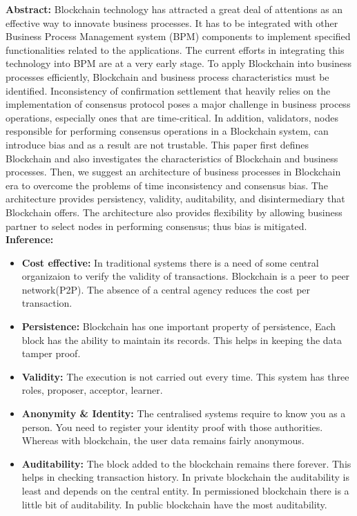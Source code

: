 \documentclass[oneside, 12pt]{book}
\begin{document}
\begin{enumerate}
	      \textbf{Abstract:} Blockchain technology has attracted a great deal of attentions as an effective way to innovate business processes. It has to be integrated with other Business Process Management system (BPM) components to implement specified functionalities related to the applications. The current efforts in integrating this technology into BPM are at a very early stage. To apply Blockchain into business processes efficiently, Blockchain and business process characteristics must be identified. Inconsistency of confirmation settlement that heavily relies on the implementation of consensus protocol poses a major challenge in business process operations, especially ones that are time-critical. In addition, validators, nodes responsible for performing consensus operations in a Blockchain system, can introduce bias and as a result are not trustable. This paper first defines Blockchain and also investigates the characteristics of Blockchain and business processes. Then, we suggest an architecture of business processes in Blockchain era to overcome the problems of time inconsistency and consensus bias. The architecture provides persistency, validity, auditability, and disintermediary that Blockchain offers. The architecture also provides flexibility by allowing business partner to select nodes in performing consensus; thus bias is mitigated.\\
		  \newpage
	      \textbf{Inference:}
	      \begin{itemize}
		      \item\textbf{Cost effective:} In traditional systems there is a need of some central organizaion to verify the validity of transactions. Blockchain is a peer to peer network(P2P). The absence of a central agency reduces the cost per transaction.
		      \item\textbf{Persistence:} Blockchain has one important property of persistence, Each block has the ability to maintain its records. This helps in keeping the data tamper proof.
		      \item\textbf{Validity:} The execution is not carried out every time. This system has three roles, proposer, acceptor, learner.
		      \item\textbf{Anonymity \& Identity:} The centralised systems require to know you as a person. You need to register your identity proof with those authorities. Whereas with blockchain, the user data remains fairly anonymous.
		      \item\textbf{Auditability:} The block added to the blockchain remains there forever. This helps in checking transaction history. In private blockchain the auditability is least and depends on the central entity. In permissioned blockchain there is a little bit of auditability. In public blockchain have the most auditability.

\end{itemize}
\end{enumerate}
\end{document}
